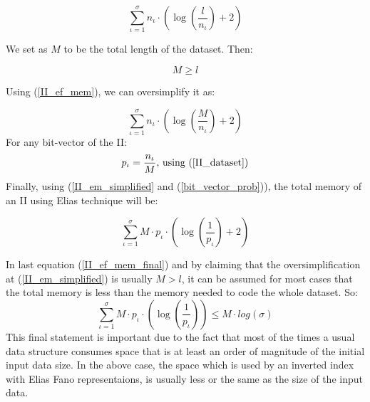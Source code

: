 \begin{equation} \label{II_ef_mem}
\sum_{\iota = 1}^{\sigma} n_{\iota}\cdot ( \log(\frac{l}{n_{\iota}}) + 2 )
\end{equation}

We set as \(M\) to be the total length of the dataset. Then:

\begin{equation} \label{II_dataset}
	M \geq l 
\end{equation} 

Using (\ref{II_ef_mem}), we can oversimplify it as:

\begin{equation}\label{II_em_simplified}
	\sum_{\iota = 1}^{\sigma} n_{\iota}\cdot ( \log(\frac{M}{n_{\iota}}) + 2 )
\end{equation}
For any bit-vector of the II:
\begin{equation} \label{bit_vector_prob}
	p_{\iota} = \frac{n_{\iota}}{M} \textnormal{, using (\ref{II_dataset})}
\end{equation}
Finally, using (\ref{II_em_simplified} and (\ref{bit_vector_prob})), the total memory of an II using Elias technique will be:

\begin{equation} \label{II_ef_mem_final}
	\sum_{\iota = 1}^{\sigma} M\cdot p_{\iota}\cdot ( \log(\frac{1}{p_{\iota}}) + 2 )
\end{equation}

In last equation (\ref{II_ef_mem_final}) and by claiming that the oversimplification at (\ref{II_em_simplified}) is usually \(M > l \), it can be assumed for most cases that the total memory is less than the memory needed to code the whole dataset. So:
\begin{equation}
	\sum_{\iota = 1}^{\sigma} M\cdot p_{\iota}\cdot ( \log(\frac{1}{p_{\iota}})) \leq M\cdot log(\sigma)
\end{equation}
This final statement is important due to the fact that most of the times a usual data structure consumes space that is at least an order of magnitude of the initial input data size. In the above case, the space which is used by an inverted index with Elias Fano representaions, is usually less or the same as the size of the input data.
